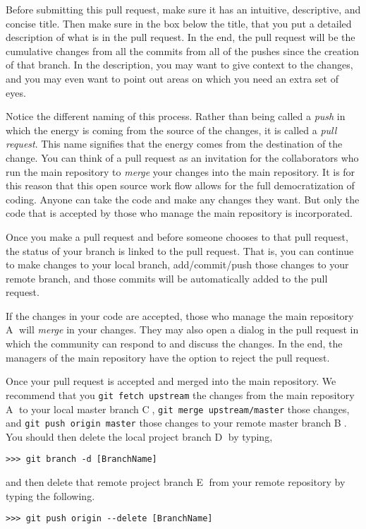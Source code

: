     Before submitting this pull request, make sure it has an intuitive, descriptive, and concise title. Then make sure in the box below the title, that you put a detailed description of what is in the pull request. In the end, the pull request will be the cumulative changes from all the commits from all of the pushes since the creation of that branch. In the description, you may want to give context to the changes, and you may even want to point out areas on which you need an extra set of eyes.

    Notice the different naming of this process. Rather than being called a \textit{push} in which the energy is coming from the source of the changes, it is called a \textit{pull request}. This name signifies that the energy comes from the destination of the change. You can think of a pull request as an invitation for the collaborators who run the main repository to \textit{merge} your changes into the main repository. It is for this reason that this open source work flow allows for the full democratization of coding. Anyone can take the code and make any changes they want. But only the code that is accepted by those who manage the main repository is incorporated.

    Once you make a pull request and before someone chooses to  that pull request, the status of your branch is linked to the pull request. That is, you can continue to make changes to your local branch, add/commit/push those changes to your remote branch, and those commits will be automatically added to the pull request.

    If the changes in your code are accepted, those who manage the main repository \textcircled{A} will \textit{merge} in your changes. They may also open a dialog in the pull request in which the community can respond to and discuss the changes. In the end, the managers of the main repository have the option to reject the pull request.

    Once your pull request is accepted and merged into the main repository. We recommend that you \texttt{git fetch upstream} the changes from the main repository \textcircled{A} to your local master branch \textcircled{C}, \texttt{git merge upstream/master} those changes, and \texttt{git push origin master} those changes to your remote master branch \textcircled{B}. You should then delete the local project branch \textcircled{D} by typing,
    \begin{lstlisting}[frame=single]
      >>> git branch -d [BranchName]
    \end{lstlisting}
    and then delete that remote project branch \textcircled{E} from your remote repository by typing the following.
    \begin{lstlisting}[frame=single]
      >>> git push origin --delete [BranchName]
    \end{lstlisting}


